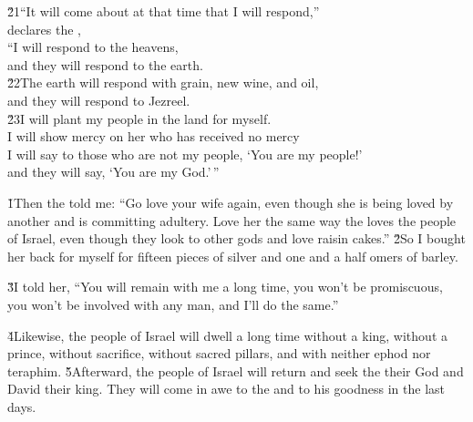 \begin{poetry}
\poeml \v{21}``It will come about at that time that I will respond,'' \\
\poemll    declares the , \\
\poeml ``I will respond to the heavens, \\
\poemll    and they will respond to the earth. \\
\poeml \v{22}The earth will respond with grain, new wine, and oil, \\
\poemll    and they will respond to Jezreel. \\
\poeml \v{23}I will plant my people in the land for myself. \\
\poemll    I will show mercy on her who has received no mercy \\
\poeml I will say to those who are not my people, `You are my people!' \\
\poemll    and they will say, `You are my God.'\,''
\end{poetry}

\v{1}Then the  told me: ``Go love your wife again, even though she is being loved by another and is committing adultery. Love her the same way the  loves the people of Israel, even though they look to other gods and love raisin cakes.'' \v{2}So I bought her back for myself for fifteen pieces of silver and one and a half omers of barley.

\v{3}I told her, ``You will remain with me a long time, you won't be promiscuous, you won't be involved with any man, and I'll do the same.''

\v{4}Likewise, the people of Israel will dwell a long time without a king, without a prince, without sacrifice, without sacred pillars, and with neither ephod nor teraphim. \v{5}Afterward, the people of Israel will return and seek the  their God and David their king. They will come in awe to the  and to his goodness in the last days.

